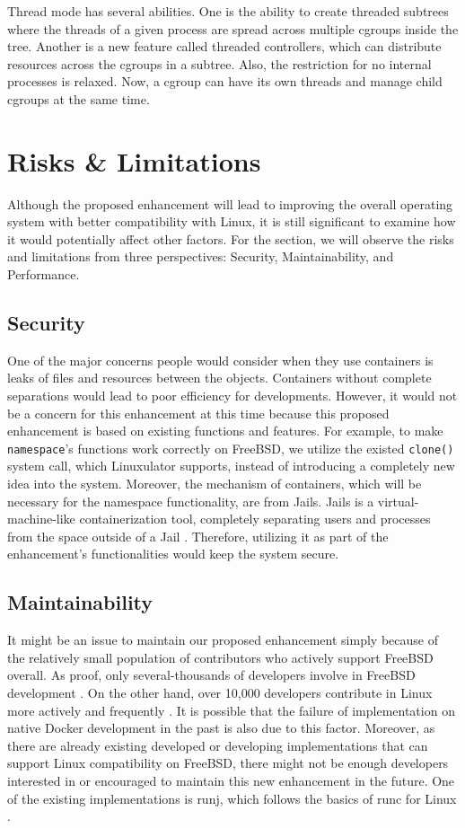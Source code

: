 \documentclass[12pt, dvipsnames, a4paper]{article}
\begin{document}
Thread mode has several abilities. One is the ability to create threaded subtrees where the threads of a given process are spread across multiple cgroups inside the tree. Another is a new feature called threaded controllers, which can distribute resources across the cgroups in a subtree. Also, the restriction for no internal processes is relaxed. Now, a cgroup can have its own threads and manage child cgroups at the same time. 

\section{Risks \& Limitations}
Although the proposed enhancement will lead to improving the overall operating system with better compatibility with Linux, it is still significant to examine how it would potentially affect other factors. For the section, we will observe the risks and limitations from three perspectives: Security, Maintainability, and Performance.

\subsection{Security}
One of the major concerns people would consider when they use containers is leaks of files and resources between the objects. Containers without complete separations would lead to poor efficiency for developments. However, it would not be a concern for this enhancement at this time because this proposed enhancement is based on existing functions and features. For example, to make \texttt{namespace}’s functions work correctly on FreeBSD, we utilize the existed \texttt{clone()} system call, which Linuxulator supports, instead of introducing a completely new idea into the system. Moreover, the mechanism of containers, which will be necessary for the namespace functionality, are from Jails. Jails is a virtual-machine-like containerization tool, completely separating users and processes from the space outside of a Jail \cite{jail}. Therefore, utilizing it as part of the enhancement’s functionalities would keep the system secure.

\subsection{Maintainability}
It might be an issue to maintain our proposed enhancement simply because of the relatively small population of contributors who actively support FreeBSD overall. As proof, only several-thousands of developers involve in FreeBSD development \cite{freebsd}. On the other hand, over 10,000 developers contribute in Linux more actively and frequently \cite{linux}. It is possible that the failure of implementation on native Docker development in the past is also due to this factor. Moreover, as there are already existing developed or developing implementations that can support Linux compatibility on FreeBSD, there might not be enough developers interested in or encouraged to maintain this new enhancement in the future. One of the existing implementations is runj, which follows the basics of runc for Linux \cite{runj}.
\end{document}

